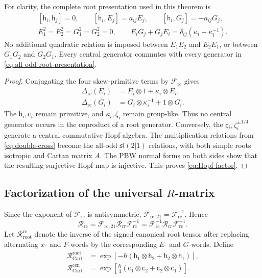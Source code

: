 \documentclass[11pt,a4paper]{article}
\newcommand{\ot}{\otimes}
\newcommand{\rc}{\mathrm{rc}}
\newcommand{\cen}{\mathrm{cen}}
\newcommand{\rootpart}{\mathrm{root}}
\theoremstyle{definition}
\theoremstyle{remark}
\begin{document}
For clarity, the complete root presentation used in this theorem is
\begin{equation}\label{eq:all-odd-root-presentation}
\begin{gathered}
 [\mathsf h_i,\mathsf h_j]=0,
 \qquad [\mathsf h_i,E_j]=a_{ij}E_j,
 \qquad [\mathsf h_i,G_j]=-a_{ij}G_j,\\
 E_1^2=E_2^2=G_1^2=G_2^2=0,
 \qquad
 E_iG_j+G_jE_i
 =\delta_{ij}(\kappa_i-\kappa_i^{-1}).
\end{gathered}
\end{equation}
No additional quadratic relation is imposed between \(E_1E_2\) and
\(E_2E_1\), or between \(G_1G_2\) and \(G_2G_1\).  Every central
generator commutes with every generator in
\eqref{eq:all-odd-root-presentation}.

\begin{proof}
Conjugating the four skew-primitive terms by
\(\mathcal F_{\rc}\) gives
\[
\begin{aligned}
 \Delta_{\rc}(E_i)&=E_i\ot1+\kappa_i\ot E_i,\\
 \Delta_{\rc}(G_i)&=G_i\ot\kappa_i^{-1}+1\ot G_i.
\end{aligned}
\]
The \(\mathsf h_i,\mathsf c_i\) remain primitive, and \(\kappa_i,\zeta_i\)
remain group-like.  Thus no central generator occurs in the coproduct of
a root generator.  Conversely, the \(\mathsf c_i,\zeta_i^{\pm1/4}\)
generate a central commutative Hopf algebra.  The multiplication relations
from \eqref{eq:double-cross} become the all-odd
\(\mathfrak{sl}(2|1)\) relations, with both simple roots isotropic and
Cartan matrix \(A\).  The PBW normal forms on both sides show that the
resulting surjective Hopf map is injective.  This proves
\eqref{eq:Hopf-factor}.
\end{proof}

\subsection[Factorization of the universal R-matrix]
{Factorization of the universal \(R\)-matrix}

Since the exponent of \(\mathcal F_{\rc}\) is antisymmetric,
\(\mathcal F_{\rc,21}=\mathcal F_{\rc}^{-1}\).  Hence
\[
 \mathcal R_{\rc}
 =\mathcal F_{\rc,21}\mathcal R_{\mathrm{rr}}
  \mathcal F_{\rc}^{-1}
 =\mathcal F_{\rc}^{-1}\mathcal R_{\mathrm{rr}}
  \mathcal F_{\rc}^{-1}.
\]
Let \(\mathcal R_{\rootpart}^{\rc}\) denote the inverse of the signed
canonical root tensor after replacing alternating \(x\)- and \(F\)-words
by the corresponding \(E\)- and \(G\)-words.  Define
\[
\begin{aligned}
 \mathcal R_{\mathrm{Cart}}^{\rootpart}
 &=
 \exp\!\left[-\hbar(
 \mathsf h_1\ot\mathsf h_2+\mathsf h_2\ot\mathsf h_1)\right],\\
 \mathcal R_{\mathrm{Cart}}^{\cen}
 &=
 \exp\!\left[\frac{\hbar}{4}(
 \mathsf c_1\ot\mathsf c_2+\mathsf c_2\ot\mathsf c_1)\right].
\end{aligned}
\]
\end{document}
